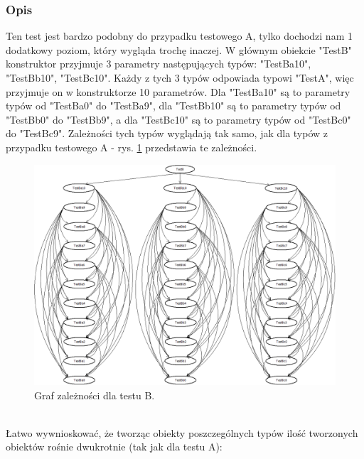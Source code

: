 \documentclass[12pt]{article}
\begin{document}
\subsubsection{Opis}
Ten test jest bardzo podobny do przypadku testowego A, tylko dochodzi nam 1 dodatkowy poziom, który wygląda trochę inaczej. W głównym obiekcie "TestB" konstruktor przyjmuje 3 parametry następujących typów: "TestBa10", "TestBb10", "TestBc10". Każdy z tych 3 typów odpowiada typowi "TestA", więc przyjmuje on w konstruktorze 10 parametrów. Dla "TestBa10" są to parametry typów od "TestBa0" do "TestBa9", dla "TestBb10" są to parametry typów od "TestBb0" do "TestBb9", a dla "TestBc10" są to parametry typów od "TestBc0" do "TestBc9". Zależności tych typów wyglądają tak samo, jak dla typów z przypadku testowego A - rys. \ref{fig:testB} przedstawia te zależności.
\begin{figure}[h]
	\begin{center}
  		\includegraphics[width=\linewidth]{TestB.png}
  		\caption{Graf zależności dla testu B.}
  		\label{fig:testB}
	\end{center}
\end{figure}\\
Łatwo wywnioskować, że tworząc obiekty poszczególnych typów ilość tworzonych obiektów rośnie dwukrotnie (tak jak dla testu A):
\end{document}
